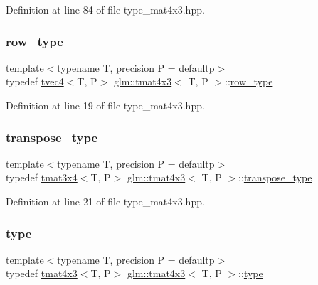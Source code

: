 Definition at line 84 of file type\+\_\+mat4x3.\+hpp.

\mbox{\label{structglm_1_1tmat4x3_aeed2de6aadeb405b11529071cddb9fe9}} 
\subsubsection{\texorpdfstring{row\_type}{row\_type}}
{\footnotesize\ttfamily template$<$typename T, precision P = defaultp$>$ \\
typedef \mbox{\hyperlink{structglm_1_1tvec4}{tvec4}}$<$T, P$>$ \mbox{\hyperlink{structglm_1_1tmat4x3}{glm\+::tmat4x3}}$<$ T, P $>$\+::\mbox{\hyperlink{structglm_1_1tmat4x3_aeed2de6aadeb405b11529071cddb9fe9}{row\+\_\+type}}}



Definition at line 19 of file type\+\_\+mat4x3.\+hpp.

\mbox{\label{structglm_1_1tmat4x3_a367488f91f7e419b75ddee7fe2d44a20}} 
\subsubsection{\texorpdfstring{transpose\_type}{transpose\_type}}
{\footnotesize\ttfamily template$<$typename T, precision P = defaultp$>$ \\
typedef \mbox{\hyperlink{structglm_1_1tmat3x4}{tmat3x4}}$<$T, P$>$ \mbox{\hyperlink{structglm_1_1tmat4x3}{glm\+::tmat4x3}}$<$ T, P $>$\+::\mbox{\hyperlink{structglm_1_1tmat4x3_a367488f91f7e419b75ddee7fe2d44a20}{transpose\+\_\+type}}}



Definition at line 21 of file type\+\_\+mat4x3.\+hpp.

\mbox{\label{structglm_1_1tmat4x3_a3aedff8ef82d31052444d388ededef55}} 
\subsubsection{\texorpdfstring{type}{type}}
{\footnotesize\ttfamily template$<$typename T, precision P = defaultp$>$ \\
typedef \mbox{\hyperlink{structglm_1_1tmat4x3}{tmat4x3}}$<$T, P$>$ \mbox{\hyperlink{structglm_1_1tmat4x3}{glm\+::tmat4x3}}$<$ T, P $>$\+::\mbox{\hyperlink{structglm_1_1tmat4x3_a3aedff8ef82d31052444d388ededef55}{type}}}



